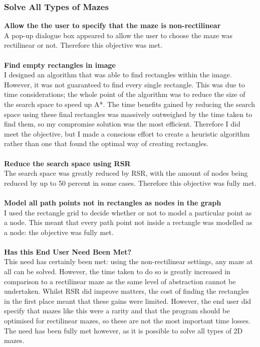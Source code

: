 \documentclass[titlepage]{article}
\begin{document}
\subsubsection{Solve All Types of Mazes}
\textbf{Allow the the user to specify that the maze is non-rectilinear}\\
A pop-up dialogue box appeared to allow the user to choose the maze was rectilinear or not. Therefore this objective was met.\\\\
\textbf{Find empty rectangles in image}\\
I designed an algorithm that was able to find rectangles within the image. However, it was not guaranteed to find every single rectangle. This was due to time considerations; the whole point of the algorithm was to reduce the size of the search space to speed up A*. The time benefits gained by reducing the search space using these final rectangles was massively outweighed by the time taken to find them, so my compromise solution was the most efficient. Therefore I did meet the objective, but I made a conscious effort to create a heuristic algorithm rather than one that found the optimal way of creating rectangles.\\\\
\textbf{Reduce the search space using RSR}\\
The search space was greatly reduced by RSR, with the amount of nodes being reduced by up to 50 percent in some cases. Therefore this objective was fully met. \\\\
\textbf{Model all path points not in rectangles as nodes in the graph}\\
I used the rectangle grid to decide whether or not to model a particular point as a node. This meant that every path point not inside a rectangle was modelled as a node: the objective was fully met. \\\\
\textbf{Has this End User Need Been Met?}\\
This need has certainly been met: using the non-rectilinear settings, any maze at all can be solved. However, the time taken to do so is greatly increased in comparison to a rectilinear maze as the same level of abstraction cannot be undertaken. Whilst RSR did improve matters, the cost of finding the rectangles in the first place meant that these gains were limited. However, the end user did specify that mazes like this were a rarity and that the program should be optimised for rectilinear mazes, so these are not the most important time losses. The need has been fully met however, as it is possible to solve all types of 2D mazes. 
\end{document}
